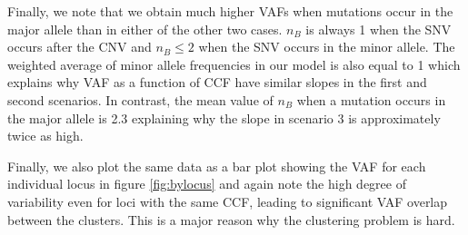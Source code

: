 \documentclass{article}
\begin{document}
Finally, we note that we obtain much higher VAFs when mutations occur in the major allele than in either of the other two cases. $n_B$ is always 1 when the SNV occurs after the CNV and $n_B \leq 2$ when the SNV occurs in the minor allele. The weighted average of minor allele frequencies in our model is also equal to 1 which explains why VAF as a function of CCF have similar slopes in the first and second scenarios. In contrast, the mean value of $n_B$ when a mutation occurs in the major allele is 2.3 explaining why the slope in scenario 3 is approximately twice as high.

Finally, we also plot the same data as a bar plot showing the VAF for each individual locus in figure \ref{fig:bylocus} and again note the high degree of variability even for loci with the same CCF, leading to significant VAF overlap between the clusters. This is a major reason why the clustering problem is hard.
\end{document}
